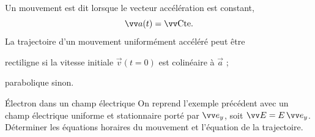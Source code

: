 \documentclass[12pt,fancy]{cours}
\begin{document}
Un mouvement est dit  lorsque le vecteur accélération est constant,
\begin{equation}
\Vec{a}(t) = \Vec{\rm Cte}.
\end{equation}
La trajectoire d’un mouvement uniformément accéléré peut être
\begin{liste}
  \item rectiligne si la vitesse initiale $\Vec{v}(t=0)$ est colinéaire à $\Vec{a}$ ;
  \item parabolique sinon.
\end{liste}


\begin{exemple}{Électron dans un champ électrique}
On reprend l'exemple précédent avec un champ électrique uniforme et stationnaire porté par $\ey$, soit $\Vec{E}=E\,\ey$. Déterminer les équations horaires du mouvement et l'équation de la trajectoire.
\end{exemple}
\end{document}

